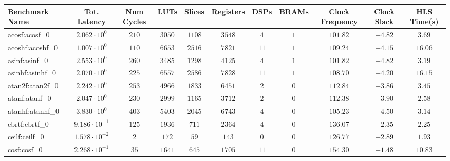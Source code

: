 \begin{tabular}{|l|c|c|c|c|c|c|c|c|c|c|}
\hline
Benchmark Name               & Tot. Latency            & Num Cycles & LUTs       & Slices    & Registers  & DSPs    & BRAMs & Clock Frequency & Clock Slack & HLS Time(s) \\
\hline
acosf:acosf\_0               & $ 2.062 \cdot 10^{0}  $ & $ 210    $ & $ 3050   $ & $ 1108  $ & $ 3548   $ & $ 4   $ & $ 1 $ & $ 101.82      $ & $ -4.82   $ & $ 3.69    $ \\
acoshf:acoshf\_0             & $ 1.007 \cdot 10^{0}  $ & $ 110    $ & $ 6653   $ & $ 2516  $ & $ 7821   $ & $ 11  $ & $ 1 $ & $ 109.24      $ & $ -4.15   $ & $ 16.06   $ \\
asinf:asinf\_0               & $ 2.553 \cdot 10^{0}  $ & $ 260    $ & $ 3485   $ & $ 1298  $ & $ 4125   $ & $ 4   $ & $ 1 $ & $ 101.82      $ & $ -4.82   $ & $ 3.19    $ \\
asinhf:asinhf\_0             & $ 2.070 \cdot 10^{0}  $ & $ 225    $ & $ 6557   $ & $ 2586  $ & $ 7828   $ & $ 11  $ & $ 1 $ & $ 108.70      $ & $ -4.20   $ & $ 16.15   $ \\
atan2f:atan2f\_0             & $ 2.242 \cdot 10^{0}  $ & $ 253    $ & $ 4966   $ & $ 1833  $ & $ 6451   $ & $ 2   $ & $ 0 $ & $ 112.84      $ & $ -3.86   $ & $ 3.45    $ \\
atanf:atanf\_0               & $ 2.047 \cdot 10^{0}  $ & $ 230    $ & $ 2999   $ & $ 1165  $ & $ 3712   $ & $ 2   $ & $ 0 $ & $ 112.38      $ & $ -3.90   $ & $ 2.58    $ \\
atanhf:atanhf\_0             & $ 3.830 \cdot 10^{0}  $ & $ 403    $ & $ 5403   $ & $ 2045  $ & $ 6743   $ & $ 4   $ & $ 0 $ & $ 105.23      $ & $ -4.50   $ & $ 3.14    $ \\
cbrtf:cbrtf\_0               & $ 9.186 \cdot 10^{-1} $ & $ 125    $ & $ 1936   $ & $ 711   $ & $ 2364   $ & $ 4   $ & $ 0 $ & $ 136.07      $ & $ -2.35   $ & $ 2.25    $ \\
ceilf:ceilf\_0               & $ 1.578 \cdot 10^{-2} $ & $ 2      $ & $ 172    $ & $ 59    $ & $ 143    $ & $ 0   $ & $ 0 $ & $ 126.77      $ & $ -2.89   $ & $ 1.93    $ \\
cosf:cosf\_0                 & $ 2.268 \cdot 10^{-1} $ & $ 35     $ & $ 1641   $ & $ 645   $ & $ 1705   $ & $ 11  $ & $ 0 $ & $ 154.30      $ & $ -1.48   $ & $ 10.83   $ \\

\end{tabular}
